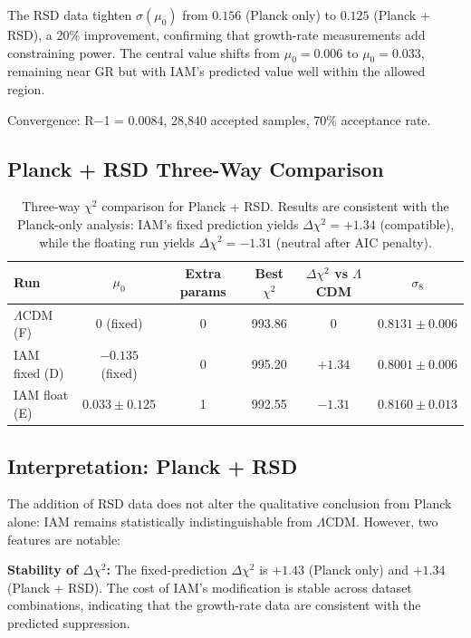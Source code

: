 \documentclass[11pt,letterpaper]{article}
\begin{document}
The RSD data tighten $\sigma(\mu_0)$ from $0.156$ (Planck only) to $0.125$ (Planck + RSD), a 20\% improvement, confirming that growth-rate measurements add constraining power. The central value shifts from $\mu_0 = 0.006$ to $\mu_0 = 0.033$, remaining near GR but with IAM's predicted value well within the allowed region.

Convergence: R$-$1 = 0.0084, 28{,}840 accepted samples, 70\% acceptance rate.

\subsection{Planck + RSD Three-Way Comparison}

\begin{table}[h]
\centering
\begin{tabular}{lccccc}
\toprule
Run & $\mu_0$ & Extra params & Best $\chi^2$ & $\Delta\chi^2$ vs $\Lambda$CDM & $\sigma_8$ \\
\midrule
$\Lambda$CDM (F) & 0 (fixed) & 0 & 993.86 & 0 & $0.8131 \pm 0.006$ \\
IAM fixed (D) & $-0.135$ (fixed) & 0 & 995.20 & $+1.34$ & $0.8001 \pm 0.006$ \\
IAM float (E) & $0.033 \pm 0.125$ & 1 & 992.55 & $-1.31$ & $0.8160 \pm 0.013$ \\
\bottomrule
\end{tabular}
\caption{Three-way $\chi^2$ comparison for Planck + RSD. Results are consistent with the Planck-only analysis: IAM's fixed prediction yields $\Delta\chi^2 = +1.34$ (compatible), while the floating run yields $\Delta\chi^2 = -1.31$ (neutral after AIC penalty).}
\label{tab:comparison_rsd}
\end{table}

\subsection{Interpretation: Planck + RSD}

The addition of RSD data does not alter the qualitative conclusion from Planck alone: IAM remains statistically indistinguishable from $\Lambda$CDM. However, two features are notable:

\textbf{Stability of $\Delta\chi^2$:} The fixed-prediction $\Delta\chi^2$ is $+1.43$ (Planck only) and $+1.34$ (Planck + RSD). The cost of IAM's modification is stable across dataset combinations, indicating that the growth-rate data are consistent with the predicted suppression.
\end{document}
